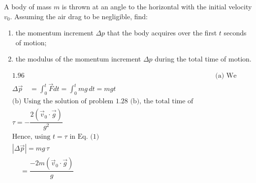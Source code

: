 \item A body of mass \( m \) is thrown at an angle to the horizontal with the initial velocity \( v_0 \). Assuming the air drag to be negligible, find:
    \begin{enumerate}
        \item the momentum increment \( \Delta p \) that the body acquires over the first \( t \) seconds of motion;
        \item the modulus of the momentum increment \( \Delta p \) during the total time of motion.
    \end{enumerate}
\begin{solution}
    \begin{align*}
        & \text{1.96} && \text{(a) We have} \\
        & \Delta \vec{p} \quad = \int_0^t \vec{F} dt = \int_0^t mg \, dt = mgt \quad \tag{1} \\
        & \text{(b) Using the solution of problem 1.28 (b), the total time of motion,} \\
        & \tau = -\dfrac{2 (\vec{v}_0 \cdot \vec{g})}{g^2} \\
        & \text{Hence, using } t = \tau \text{ in Eq. (1)} \\
        & |\Delta \vec{p}| = mg \, \tau \\
        & \quad \, = \dfrac{-2m (\vec{v}_0 \cdot \vec{g})}{g}
    \end{align*}
\end{solution}
